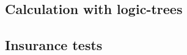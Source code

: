 \subsection{Calculation with logic-trees}
\label{subsec:eventbased-logictrees}


\subsection{Insurance tests}
\label{subsec:eventbased-insurance}

